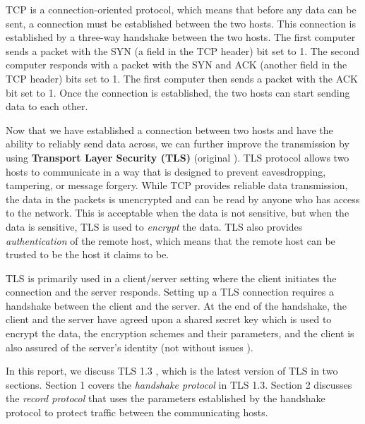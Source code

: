 TCP is a connection-oriented protocol, which means that before any data can be sent, a connection must be established between the two hosts. This connection is established by a three-way handshake between the two hosts. The first computer sends a packet with the SYN (a field in the TCP header) bit set to 1. The second computer responds with a packet with the SYN and ACK (another field in the TCP header) bits set to 1. The first computer then sends a packet with the ACK bit set to 1. Once the connection is established, the two hosts can start sending data to each other.

Now that we have established a connection between two hosts and have the ability to reliably send data across, we can further improve the transmission by using \textbf{Transport Layer Security (TLS)} \cite{rfc8446} (original \cite{rfc2246}). TLS protocol allows two hosts to communicate in a way that is designed to prevent eavesdropping, tampering, or message forgery. While TCP provides reliable data transmission, the data in the packets is unencrypted and can be read by anyone who has access to the network. This is acceptable when the data is not sensitive, but when the data is sensitive, TLS is used to \textit{encrypt} the data. TLS also provides \textit{authentication} of the remote host, which means that the remote host can be trusted to be the host it claims to be.

TLS is primarily used in a client/server setting where the client initiates the connection and the server responds. Setting up a TLS connection requires a handshake between the client and the server. At the end of the handshake, the client and the server have agreed upon a shared secret key which is used to encrypt the data, the encryption schemes and their parameters, and the client is also assured of the server's identity (not without issues \cite{rfc6962, tlsCertificateIssues}).

In this report, we discuss TLS 1.3 \cite{rfc8446}, which is the latest version of TLS in two sections. Section 1 covers the \textit{handshake protocol} in TLS 1.3. Section 2 discusses the \textit{record protocol} that uses the parameters established by the handshake protocol to protect traffic between the communicating hosts.

